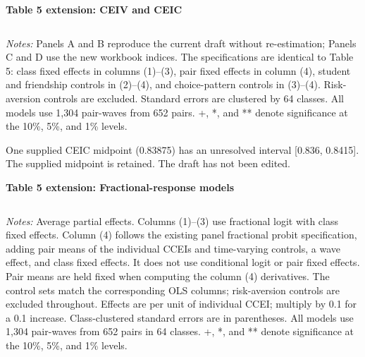 \documentclass[11pt]{article}
\begin{document}
\begin{center}\large\textbf{Table 5 extension: CEIV and CEIC}\end{center}
\begin{center}\small
\begin{tabular}{lcccc}\toprule

\end{tabular}\end{center}
\small
\textit{Notes:} Panels A and B reproduce the current draft without re-estimation;
Panels C and D use the new workbook indices. The specifications are identical to
Table 5: class fixed effects in columns (1)--(3), pair fixed effects in column (4),
student and friendship controls in (2)--(4), and choice-pattern controls in (3)--(4).
Risk-aversion controls are excluded. Standard errors are clustered by 64 classes.
All models use 1,304 pair-waves from 652 pairs.
+, *, and ** denote significance at the 10\%, 5\%, and 1\% levels.

\medskip
One supplied CEIC midpoint (0.83875) has an unresolved interval [0.836, 0.8415].
The supplied midpoint is retained. The draft has not been edited.
\clearpage
\begin{center}\large\textbf{Table 5 extension: Fractional-response models}\end{center}
\begin{center}\small
\begin{tabular}{lcccc}\toprule

\end{tabular}\end{center}
\small
\textit{Notes:} Average partial effects. Columns (1)--(3) use fractional logit with
class fixed effects. Column (4) follows the existing panel fractional probit
specification, adding pair means of the individual CCEIs and time-varying controls,
a wave effect, and class fixed effects. It does not use conditional logit or pair
fixed effects. Pair means are held fixed when computing the column (4) derivatives.
The control sets match the corresponding OLS columns; risk-aversion controls are
excluded throughout. Effects are per unit of individual CCEI; multiply by 0.1
for a 0.1 increase. Class-clustered standard errors are in parentheses.
All models use 1,304 pair-waves from 652 pairs in 64 classes.
+, *, and ** denote significance at the 10\%, 5\%, and 1\% levels.
\end{document}
